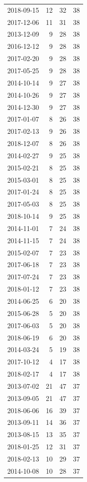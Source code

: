 \begin{tabular}{lrrr}
2018-09-15 & 12 & 32 & 38 \\
2017-12-06 & 11 & 31 & 38 \\
2013-12-09 & 9 & 28 & 38 \\
2016-12-12 & 9 & 28 & 38 \\
2017-02-20 & 9 & 28 & 38 \\
2017-05-25 & 9 & 28 & 38 \\
2014-10-14 & 9 & 27 & 38 \\
2014-10-26 & 9 & 27 & 38 \\
2014-12-30 & 9 & 27 & 38 \\
2017-01-07 & 8 & 26 & 38 \\
2017-02-13 & 9 & 26 & 38 \\
2018-12-07 & 8 & 26 & 38 \\
2014-02-27 & 9 & 25 & 38 \\
2015-02-21 & 8 & 25 & 38 \\
2015-03-01 & 8 & 25 & 38 \\
2017-01-24 & 8 & 25 & 38 \\
2017-05-03 & 8 & 25 & 38 \\
2018-10-14 & 9 & 25 & 38 \\
2014-11-01 & 7 & 24 & 38 \\
2014-11-15 & 7 & 24 & 38 \\
2015-02-07 & 7 & 23 & 38 \\
2017-06-18 & 7 & 23 & 38 \\
2017-07-24 & 7 & 23 & 38 \\
2018-01-12 & 7 & 23 & 38 \\
2014-06-25 & 6 & 20 & 38 \\
2015-06-28 & 5 & 20 & 38 \\
2017-06-03 & 5 & 20 & 38 \\
2018-06-19 & 6 & 20 & 38 \\
2014-03-24 & 5 & 19 & 38 \\
2017-10-12 & 4 & 17 & 38 \\
2018-02-17 & 4 & 17 & 38 \\
2013-07-02 & 21 & 47 & 37 \\
2013-09-05 & 21 & 47 & 37 \\
2018-06-06 & 16 & 39 & 37 \\
2013-09-11 & 14 & 36 & 37 \\
2013-08-15 & 13 & 35 & 37 \\
2018-01-25 & 12 & 31 & 37 \\
2018-02-13 & 10 & 29 & 37 \\
2014-10-08 & 10 & 28 & 37 \\

\end{tabular}
